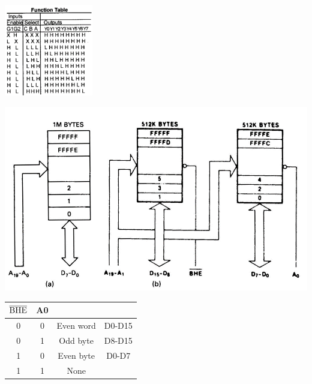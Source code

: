 \documentclass[10pt,a4paper]{article}
\begin{document}
\begin{CJK}{UTF8}{song}
\begin{twocolumn}
\begin{tcolorbox}[title=74LS138 38译码器]
			\includegraphics[height=4cm]{38T.png}
		\end{tcolorbox}
		\begin{tcolorbox}[title=8086存储组织]
			\centering
			\includegraphics[width=\linewidth]{eobanks.png}
			\begin{tabular}{|c|c|c|c|}
				\hline
				$\rm \overline{BHE}$ & A0 &  &  \\
				\hline
				0 & 0 & Even word & D0-D15 \\
				\hline
				0 & 1 & Odd byte & D8-D15 \\
				\hline
				1 & 0 & Even byte & D0-D7 \\
				\hline
				1 & 1 & None &  \\
				\hline
			\end{tabular}
		\end{tcolorbox}
	\end{twocolumn}
	\end{CJK}
\end{document}
